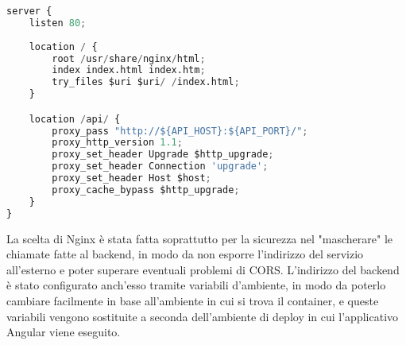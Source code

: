 \begin{lstlisting}[language=Python, caption={Configurazione Nginx del front-end}, label=list:nginx_frontend]
server {
    listen 80;
    
    location / {
        root /usr/share/nginx/html;
        index index.html index.htm;
        try_files $uri $uri/ /index.html;
    }

    location /api/ {
        proxy_pass "http://${API_HOST}:${API_PORT}/";
        proxy_http_version 1.1;
        proxy_set_header Upgrade $http_upgrade;
        proxy_set_header Connection 'upgrade';
        proxy_set_header Host $host;
        proxy_cache_bypass $http_upgrade;
    }
}
\end{lstlisting}
La scelta di Nginx è stata fatta soprattutto per la sicurezza nel "mascherare" le chiamate fatte al backend, in modo da non esporre l'indirizzo del servizio all'esterno e poter superare eventuali problemi di CORS. L'indirizzo del backend è stato configurato anch'esso tramite variabili d'ambiente, in modo da poterlo cambiare facilmente in base all'ambiente in cui si trova il container, e queste variabili vengono sostituite a seconda dell'ambiente di deploy in cui l'applicativo Angular viene eseguito.






